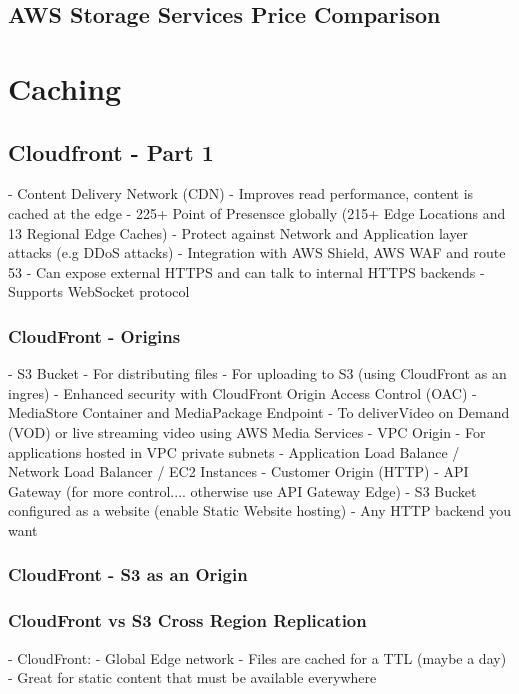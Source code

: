 \documentclass[11pt]{book}
\begin{document}
    \section{AWS Storage Services Price Comparison}


    \chapter{Caching}


    \section{Cloudfront - Part 1}
    - Content Delivery Network (CDN)
    - Improves read performance, content is cached at the edge
    - 225+ Point of Presensce globally (215+ Edge Locations and 13 Regional Edge Caches)
    - Protect against Network and Application layer attacks (e.g DDoS attacks)
    - Integration with AWS Shield, AWS WAF and route 53
    - Can expose external HTTPS and can talk to internal HTTPS backends
    - Supports WebSocket protocol

    \subsection{CloudFront - Origins}
    - S3 Bucket
    - For distributing files
    - For uploading to S3 (using CloudFront as an ingres)
    - Enhanced security with CloudFront Origin Access Control (OAC)
    - MediaStore Container and MediaPackage Endpoint
    - To deliverVideo on Demand (VOD) or live streaming video using AWS Media Services
    - VPC Origin
    - For applications hosted in VPC private subnets
    - Application Load Balance / Network Load Balancer / EC2 Instances
    - Customer Origin (HTTP)
    - API Gateway (for more control.... otherwise use API Gateway Edge)
    - S3 Bucket configured as a website (enable Static Website hosting)
    - Any HTTP backend you want

    \subsection{CloudFront - S3 as an Origin}

    \subsection{CloudFront vs S3 Cross Region Replication}
    - CloudFront:
    - Global Edge network
    - Files are cached for a TTL (maybe a day)
    - Great for static content that must be available everywhere
\end{document}

